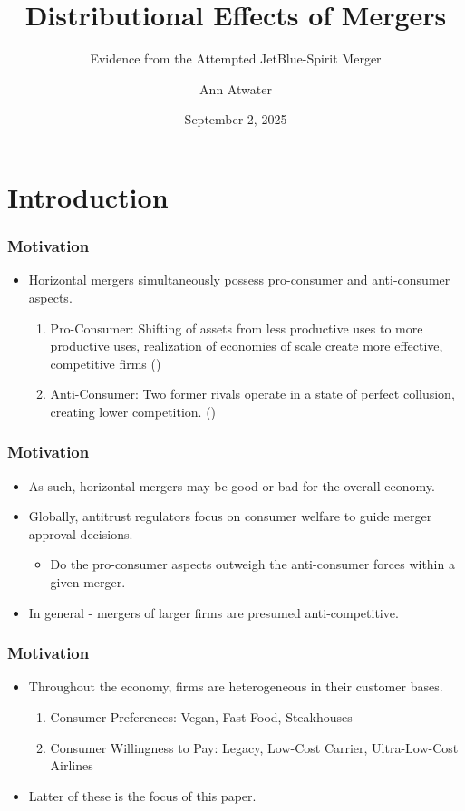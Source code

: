 \documentclass[xcolor=dvipsnames]{beamer}
\author{Ann Atwater}
\institute{University of Florida}
\title{Distributional Effects of Mergers}
\subtitle{Evidence from the Attempted JetBlue-Spirit Merger}
\date{September 2, 2025}
\begin{document}
	\section{Introduction}
	\frame{\titlepage}
    \begin{frame}
        \frametitle{Motivation}
        \begin{itemize}
            \item Horizontal mergers simultaneously possess pro-consumer and anti-consumer aspects.
            \begin{enumerate}
                \item Pro-Consumer: Shifting of assets from less productive uses to more productive uses, realization of economies of scale create more effective, competitive firms (\cite{williamson_economies_1968, farrell_horizontal_1990, kaplow_improving_2025})
                \item Anti-Consumer: Two former rivals operate in a state of perfect collusion, creating lower competition. (\cite{stigler_theory_1964})
            \end{enumerate}
        \end{itemize}
    \end{frame}

    \begin{frame}
        \frametitle{Motivation}
        \begin{itemize}
        \item As such, horizontal mergers may be good or bad for the overall economy.
            \item Globally, antitrust regulators focus on consumer welfare to guide merger approval decisions. 
            \begin{itemize}
                \item Do the pro-consumer aspects outweigh the anti-consumer forces within a given merger. 
        \end{itemize}
        \item In general - mergers of larger firms are presumed anti-competitive.
        \end{itemize}
    \end{frame}

    \begin{frame}
        \frametitle{Motivation}
        \begin{itemize}
            \item Throughout the economy, firms are heterogeneous in their customer bases.
            \begin{enumerate}
                \item Consumer Preferences: Vegan, Fast-Food, Steakhouses 
                \item Consumer Willingness to Pay: Legacy, Low-Cost Carrier, Ultra-Low-Cost Airlines
            \end{enumerate}
            \item Latter of these is the focus of this paper. 
        \end{itemize}
    \end{frame}
\end{document}
